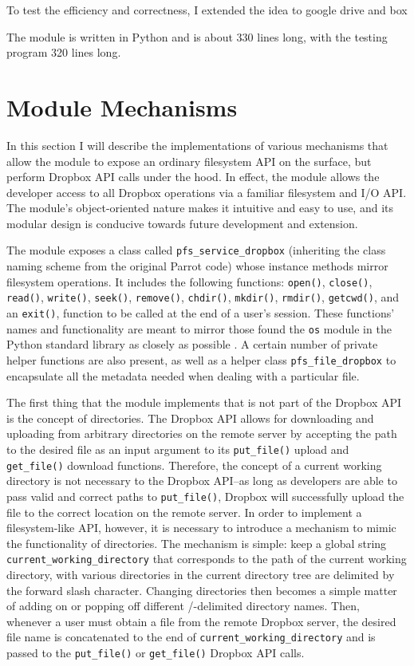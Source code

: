 \documentclass[pageno]{jpaper}
\begin{document}
To test the efficiency and correctness, I extended the idea to google drive and box 

The module is written in Python and is about 330 lines long, with the testing program 320 lines long.


\section{Module Mechanisms}
\label{sec:mechanism}
In this section I will describe the implementations of various mechanisms that allow the module to expose an ordinary filesystem API on the surface, but perform Dropbox API calls under the hood. In effect, the module allows the developer access to all Dropbox operations via a familiar filesystem and I/O API. The module's object-oriented nature makes it intuitive and easy to use, and its modular design is conducive towards future development and extension.

The module exposes a class called \texttt{pfs_service_dropbox} (inheriting the class naming scheme from the original Parrot code) whose instance methods mirror filesystem operations. It includes the following functions: \texttt{open()}, \texttt{close()}, \texttt{read()}, \texttt{write()}, \texttt{seek()}, \texttt{remove()}, \texttt{chdir()}, \texttt{mkdir()}, \texttt{rmdir()}, \texttt{getcwd()}, and an \texttt{exit()}, function to be called at the end of a user's session. These functions' names and functionality are meant to mirror those found the \texttt{os} module in the Python standard library as closely as possible \cite{ospythonpage}. A certain number of private helper functions are also present, as well as a helper class \texttt{pfs_file_dropbox} to encapsulate all the metadata needed when dealing with a particular file.

The first thing that the module implements that is not part of the Dropbox API is the concept of directories. The Dropbox API allows for downloading and uploading from arbitrary directories on the remote server by accepting the path to the desired file as an input argument to its \texttt{put_file()} upload and \texttt{get_file()} download functions. Therefore, the concept of a current working directory is not necessary to the Dropbox API--as long as developers are able to pass valid and correct paths to \texttt{put_file()}, Dropbox will successfully upload the file to the correct location on the remote server. In order to implement a filesystem-like API, however, it is necessary to introduce a mechanism to mimic the functionality of directories. The mechanism is simple: keep a global string \texttt{current_working_directory} that corresponds to the path of the current working directory, with various directories in the current directory tree are delimited by the forward slash character. Changing directories then becomes a simple matter of adding on or popping off different /-delimited directory names. Then, whenever a user must obtain a file from the remote Dropbox server, the desired file name is concatenated to the end of \texttt{current_working_directory} and is passed to the \texttt{put_file()} or \texttt{get_file()} Dropbox API calls.
\end{document}
